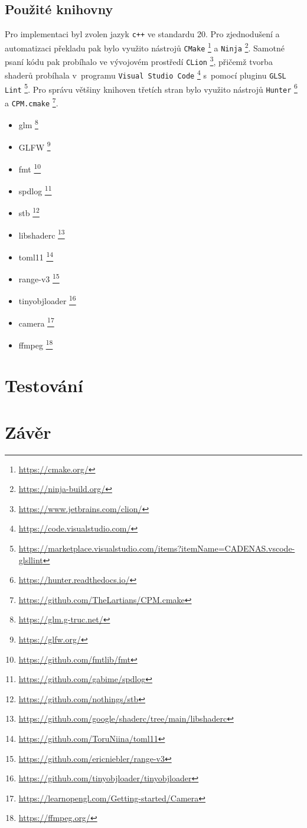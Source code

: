 \section{Použité knihovny}
Pro implementaci byl zvolen jazyk \texttt{c++} ve standardu 20. Pro zjednodušení a automatizaci překladu pak bylo využito nástrojů \texttt{CMake} \footnote{\url{https://cmake.org/}} a \texttt{Ninja} \footnote{\url{https://ninja-build.org/}}. Samotné psaní kódu pak probíhalo ve vývojovém prostředí \texttt{CLion} \footnote{\url{https://www.jetbrains.com/clion/}}, přičemž tvorba shaderů probíhala v~programu \texttt{Visual Studio Code} \footnote{\url{https://code.visualstudio.com/}} s~pomocí pluginu \texttt{GLSL Lint} \footnote{\url{https://marketplace.visualstudio.com/items?itemName=CADENAS.vscode-glsllint}}. Pro správu většiny knihoven třetích stran bylo využito nástrojů \texttt{Hunter} \footnote{\url{https://hunter.readthedocs.io/}} a \texttt{CPM.cmake} \footnote{\url{https://github.com/TheLartians/CPM.cmake}}.
\begin{multicols}{2}
    \begin{itemize}
        \item glm \footnote{\url{https://glm.g-truc.net/}}
        \item GLFW \footnote{\url{https://glfw.org/}}
        \item {fmt} \footnote{\url{https://github.com/fmtlib/fmt}}
        \item spdlog \footnote{\url{https://github.com/gabime/spdlog}}
        \item stb \footnote{\url{https://github.com/nothings/stb}}
        \item libshaderc \footnote{\url{https://github.com/google/shaderc/tree/main/libshaderc}}
        \item toml11 \footnote{\url{https://github.com/ToruNiina/toml11}}
        \item range-v3 \footnote{\url{https://github.com/ericniebler/range-v3}}
        \item tinyobjloader \footnote{\url{https://github.com/tinyobjloader/tinyobjloader}}
        \item camera \footnote{\url{https://learnopengl.com/Getting-started/Camera}}
        \item ffmpeg \footnote{\url{https://ffmpeg.org/}}
    \end{itemize}
\end{multicols}
\chapter{Testování}
\label{chapter:testovani}

\chapter{Závěr}
\label{chapter:zaver}






